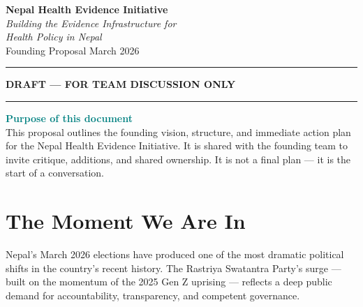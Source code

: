 \documentclass[11pt, a4paper]{article}
\begin{document}
\thispagestyle{empty}
\vspace*{3cm}

\begin{center}
  {\fontsize{28}{34}\selectfont\bfseries\color{teal}
    Nepal Health Evidence Initiative}\\[0.6em]
  {\large\itshape\color{midgray}
    Building the Evidence Infrastructure for\\[0.2em]
    Health Policy in Nepal}\\[1.2em]
  {\normalsize\color{midgray}
    Founding Proposal \quad\textbullet\quad March 2026}
\end{center}

\vspace{1.2em}
\begin{center}
  \textcolor{teal}{\rule{10cm}{0.6pt}}
\end{center}
\vspace{0.6em}

\begin{center}
  {\small\bfseries\color{teal} DRAFT --- FOR TEAM DISCUSSION ONLY}
\end{center}

\vspace{1em}
\begin{center}
  \textcolor{teal}{\rule{10cm}{0.6pt}}
\end{center}

\vspace{3cm}

\begin{callout}
\textbf{\textcolor{teal}{Purpose of this document}}\\[4pt]
This proposal outlines the founding vision, structure, and immediate action plan for the Nepal Health Evidence Initiative. It is shared with the founding team to invite critique, additions, and shared ownership. It is not a final plan --- it is the start of a conversation.
\end{callout}

\newpage

\section{The Moment We Are In}

Nepal's March 2026 elections have produced one of the most dramatic political shifts in the country's recent history. The Rastriya Swatantra Party's surge --- built on the momentum of the 2025 Gen Z uprising --- reflects a deep public demand for accountability, transparency, and competent governance.
\end{document}
